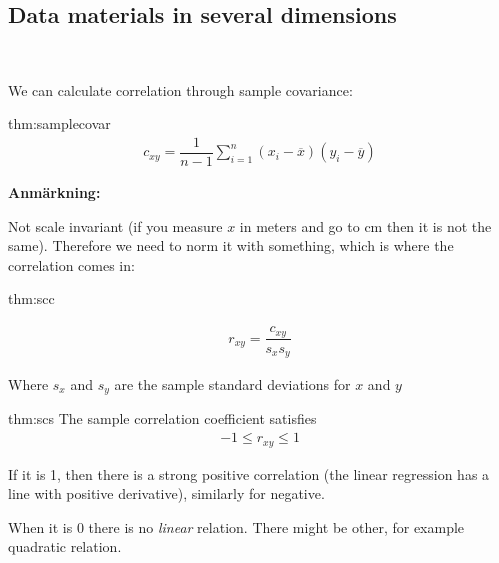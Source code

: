 \subsection{Data materials in several dimensions}\hfill\\\par
\noindent We can calculate correlation through sample covariance:
\par\bigskip
\begin{theo}{thm:samplecovar}
  \begin{equation*}
    \begin{gathered}
      c_{xy} = \dfrac{1}{n-1}\sum_{i=1}^{n}(x_i-\overline{x})(y_i-\overline{y})
    \end{gathered}
  \end{equation*}
\end{theo}\par
\noindent\textbf{Anmärkning:}\par
\noindent Not scale invariant (if you measure $x$ in meters and go to cm then it is not the same). Therefore we need to norm it with something, which is where the correlation comes in:
\par\bigskip
\begin{theo}{thm:scc}

  \begin{equation*}
    \begin{gathered}
      r_{xy} = \dfrac{c_{xy}}{s_xs_y}
    \end{gathered}
  \end{equation*}\par
  \noindent Where $s_x$ and $s_y$ are the sample standard deviations for $x$ and $y$
\end{theo}
\par\bigskip
\begin{theo}{thm:scs}
  The sample correlation coefficient satisfies
  \begin{equation*}
    \begin{gathered}
      -1\leq r_{xy}\leq 1
    \end{gathered}
  \end{equation*}\par
  \noindent If it is 1, then there is a strong positive correlation (the linear regression has a line with positive derivative), similarly for negative.\par
  \noindent When it is 0 there is no \textit{linear} relation. There might be other, for example quadratic relation.
\end{theo}
